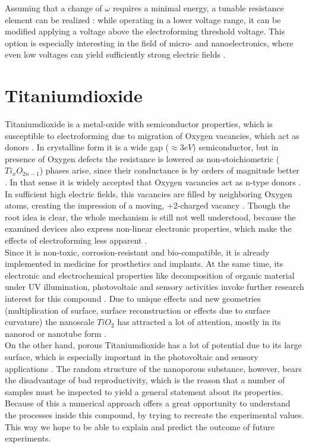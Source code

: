 \documentclass[12pt]{article}
\begin{document}
	Assuming that a change of $\omega$ requires a minimal energy, a tunable resistance element can be realized : while operating in a lower voltage range, it can be modified applying a voltage above the electroforming threshold voltage. This option is especially interesting in the field of micro- and nanoelectronics, where even low voltages can yield sufficiently strong electric fields \cite{Missing}.\\


\section{Titaniumdioxide}
	Titaniumdioxide is a metal-oxide with semiconductor properties, which is susceptible to electroforming due to migration of Oxygen vacancies, which act as donors \cite{Effect, Family}. In crystalline form it is a wide gap ($\approx 3 eV$) semiconductor, but in presence of Oxygen defects the resistance is lowered as non-stoichiometric ($Ti_xO_{2n-1}$) phases arise, since their conductance is by orders of magnitude better \cite{Etching}. In that sense it is widely accepted that Oxygen vacancies act as n-type donors \cite{Strungaru, Achhab, Etching}. In sufficient high electric fields, this vacancies are filled by neighboring Oxygen atoms, creating the impression of a moving, +2-charged vacancy \cite{Missing}. Though the root idea is clear, the whole mechanism is still not well understood, because the examined devices also express non-linear electronic properties, which make the effects of electroforming less apparent \cite{Family}.\\
	Since it is non-toxic, corrosion-resistant and bio-compatible, it is already implemented in medicine for prosthetics and implants. At the same time, its electronic and electrochemical properties like decomposition of organic material under UV illumination, photovoltaic and sensory activities invoke further research interest for this compound \cite{Etching}. Due to unique effects and new geometries (multiplication of surface, surface reconstruction or effects due to surface curvature) the nanoscale $TiO_2$ has attracted a lot of attention, mostly in its nanorod or nanotube form \cite{Etching}.\\
	On the other hand, porous Titaniumdioxide has a lot of potential due to its large surface, which is especially important in the photovoltaic and sensory applications \cite{Achhab, Etching}. The random structure of the nanoporous substance, however, bears the disadvantage of bad reproductivity, which is the reason that a number of samples must be inspected to yield a general statement about its properties. Because of this a numerical approach offers a great opportunity to understand the processes inside this compound, by trying to recreate the experimental values. This way we hope to be able to explain and predict the outcome of future experiments.
	
\end{document}
